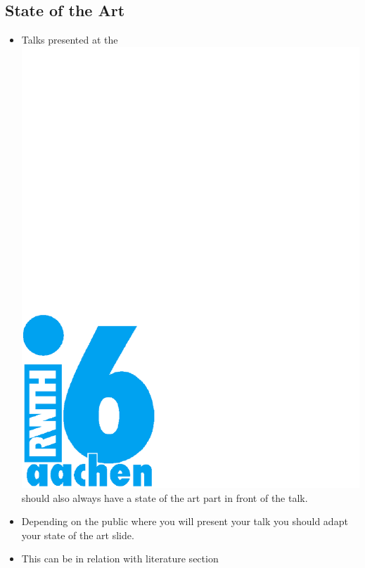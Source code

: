 \documentclass[11pt,a4paper,landscape]{article}
\begin{document}
\NewPage\subsection{State of the Art} 
\begin{itemize}
\item Talks presented at the
  \href{http:://www-i6.rwth-aachen.de/}{\includegraphics[height=\baselineskip]{logos/i6-hks44}}
  should also always have a state of the art part in front of the talk.
\item Depending on the public where you will present your talk you should
adapt your state of the art slide.
\item This can be in relation with literature section
\end{itemize}
\end{document}
